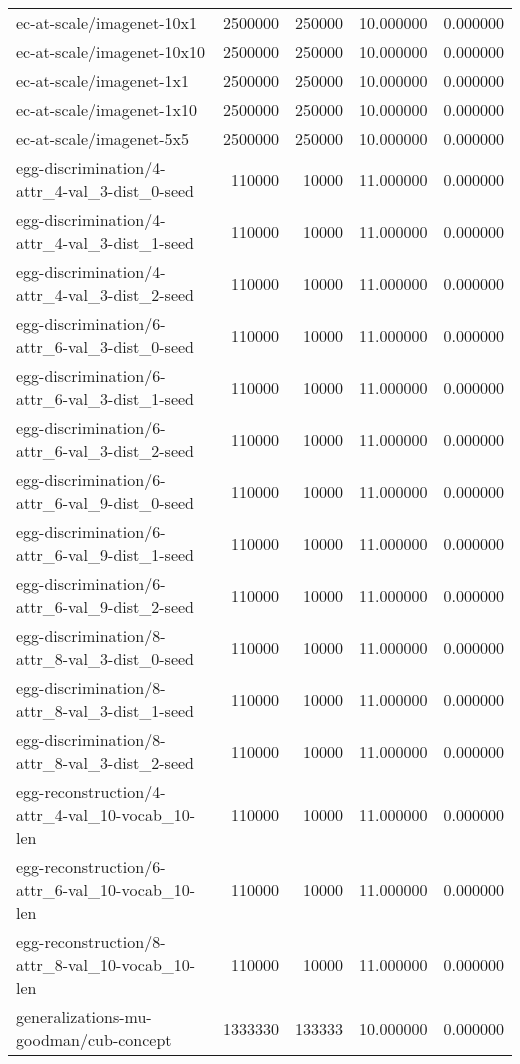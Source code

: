 \begin{tabular}{lrrrr}
ec-at-scale/imagenet-10x1 & 2500000 & 250000 & 10.000000 & 0.000000 \\
ec-at-scale/imagenet-10x10 & 2500000 & 250000 & 10.000000 & 0.000000 \\
ec-at-scale/imagenet-1x1 & 2500000 & 250000 & 10.000000 & 0.000000 \\
ec-at-scale/imagenet-1x10 & 2500000 & 250000 & 10.000000 & 0.000000 \\
ec-at-scale/imagenet-5x5 & 2500000 & 250000 & 10.000000 & 0.000000 \\
egg-discrimination/4-attr\_4-val\_3-dist\_0-seed & 110000 & 10000 & 11.000000 & 0.000000 \\
egg-discrimination/4-attr\_4-val\_3-dist\_1-seed & 110000 & 10000 & 11.000000 & 0.000000 \\
egg-discrimination/4-attr\_4-val\_3-dist\_2-seed & 110000 & 10000 & 11.000000 & 0.000000 \\
egg-discrimination/6-attr\_6-val\_3-dist\_0-seed & 110000 & 10000 & 11.000000 & 0.000000 \\
egg-discrimination/6-attr\_6-val\_3-dist\_1-seed & 110000 & 10000 & 11.000000 & 0.000000 \\
egg-discrimination/6-attr\_6-val\_3-dist\_2-seed & 110000 & 10000 & 11.000000 & 0.000000 \\
egg-discrimination/6-attr\_6-val\_9-dist\_0-seed & 110000 & 10000 & 11.000000 & 0.000000 \\
egg-discrimination/6-attr\_6-val\_9-dist\_1-seed & 110000 & 10000 & 11.000000 & 0.000000 \\
egg-discrimination/6-attr\_6-val\_9-dist\_2-seed & 110000 & 10000 & 11.000000 & 0.000000 \\
egg-discrimination/8-attr\_8-val\_3-dist\_0-seed & 110000 & 10000 & 11.000000 & 0.000000 \\
egg-discrimination/8-attr\_8-val\_3-dist\_1-seed & 110000 & 10000 & 11.000000 & 0.000000 \\
egg-discrimination/8-attr\_8-val\_3-dist\_2-seed & 110000 & 10000 & 11.000000 & 0.000000 \\
egg-reconstruction/4-attr\_4-val\_10-vocab\_10-len & 110000 & 10000 & 11.000000 & 0.000000 \\
egg-reconstruction/6-attr\_6-val\_10-vocab\_10-len & 110000 & 10000 & 11.000000 & 0.000000 \\
egg-reconstruction/8-attr\_8-val\_10-vocab\_10-len & 110000 & 10000 & 11.000000 & 0.000000 \\
generalizations-mu-goodman/cub-concept & 1333330 & 133333 & 10.000000 & 0.000000 \\

\end{tabular}
